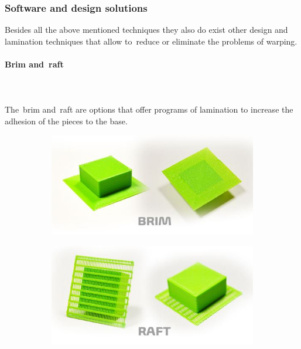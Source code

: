 \documentclass[11pt,a4paper]{article}
\begin{document}
		\subsubsection{Software and design solutions}Besides all the above mentioned techniques they also do exist other design and lamination techniques that allow to reduce or eliminate the problems of warping.
			\paragraph{Brim and raft}\mbox{}\\\\
The brim and raft are options that offer programs of lamination to increase the adhesion of the pieces to the base.
\begin{figure}[H]
    \centering
    \begin{subfigure}[b]{0.4\textwidth}
        \includegraphics[width=\textwidth,cfbox=azul_marcos 4pt 0pt]{FOTOS/BRIM}
    \end{subfigure}
    \qquad %
    \begin{subfigure}[b]{0.4\textwidth}
        \includegraphics[width=\textwidth,cfbox=azul_marcos 4pt 0pt]{FOTOS/RAFT}
    \end{subfigure}   
\end{figure}
\end{document}
